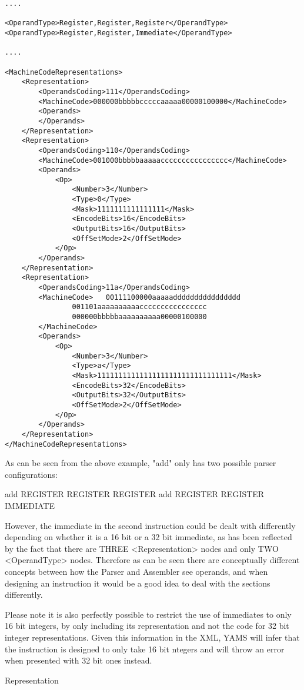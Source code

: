 \documentclass[12pt]{report}
\begin{document}
\begin{verbatim}
....

<OperandType>Register,Register,Register</OperandType>
<OperandType>Register,Register,Immediate</OperandType>

....

<MachineCodeRepresentations>
	<Representation>
		<OperandsCoding>111</OperandsCoding>
		<MachineCode>000000bbbbbcccccaaaaa00000100000</MachineCode>
		<Operands>
		</Operands>
	</Representation>
	<Representation>
		<OperandsCoding>110</OperandsCoding>
		<MachineCode>001000bbbbbaaaaacccccccccccccccc</MachineCode>
		<Operands>
			<Op>
				<Number>3</Number>
				<Type>0</Type>
				<Mask>1111111111111111</Mask>
				<EncodeBits>16</EncodeBits>
				<OutputBits>16</OutputBits>
				<OffSetMode>2</OffSetMode>
			</Op>
		</Operands>
	</Representation>
	<Representation>
		<OperandsCoding>11a</OperandsCoding>
		<MachineCode>	00111100000aaaaadddddddddddddddd
				001101aaaaaaaaaacccccccccccccccc
				000000bbbbbaaaaaaaaaa00000100000
		</MachineCode>
		<Operands>
			<Op>
				<Number>3</Number>
				<Type>a</Type>
				<Mask>11111111111111111111111111111111</Mask>
				<EncodeBits>32</EncodeBits>
				<OutputBits>32</OutputBits>
				<OffSetMode>2</OffSetMode>
			</Op>
		</Operands>
	</Representation>
</MachineCodeRepresentations>
\end{verbatim}

As can be seen from the above example, "add" only has two possible parser configurations:

add REGISTER REGISTER REGISTER
add REGISTER REGISTER IMMEDIATE

However, the immediate in the second instruction could be dealt with differently depending on whether it is a 16 bit or a 32 bit immediate, as has been reflected by the fact that there are THREE <Representation> nodes and only TWO <OperandType> nodes. Therefore as can be seen there are conceptually different concepts between how the Parser and Assembler see operands, and when designing an instruction it would be a good idea to deal with the sections differently.

Please note it is also perfectly possible to restrict the use of immediates to only 16 bit integers, by only including its representation and not the code for 32 bit integer representations. Given this information in the XML, YAMS will infer that the instruction is designed to only take 16 bit ntegers and will throw an error when presented with 32 bit ones instead.

Representation
\end{document}
